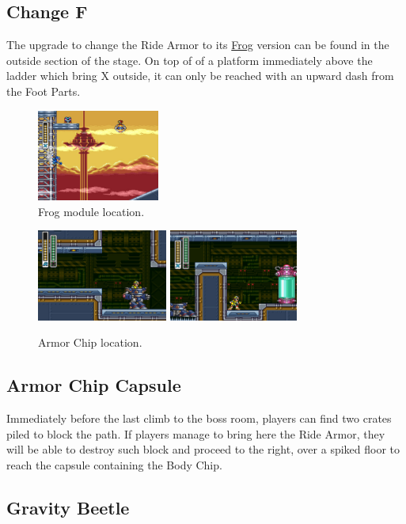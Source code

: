 \subsection{Change F}
The upgrade to change the Ride Armor to its \hyperlink{vehicle:Ride_Armor_Frog}{Frog} version can be found in the outside section of the stage. On top of of a platform immediately above the ladder which bring X outside, it can only be reached with an upward dash from the Foot Parts.
\begin{figure}[htp]
	\centering
	\includegraphics[height=3cm]{figures/X3/Gravity_beetle/Frog.jpg}
	\caption{Frog module location.}
\end{figure}
\begin{figure}[htp]
	\centering
	\includegraphics[height=3cm]{figures/X3/Gravity_beetle/Armor_1.png}
	\includegraphics[height=3cm]{figures/X3/Gravity_beetle/Armor_2.png}
	\caption{Armor Chip location.}
\end{figure}
\subsection{Armor Chip Capsule}
Immediately before the last climb to the boss room, players can find two crates piled to block the path. If players manage to bring here the Ride Armor, they will be able to destroy such block and proceed to the right, over a spiked floor to reach the capsule containing the Body Chip.


\subsection{Gravity Beetle}\label{boss:Gravity_beetle}

